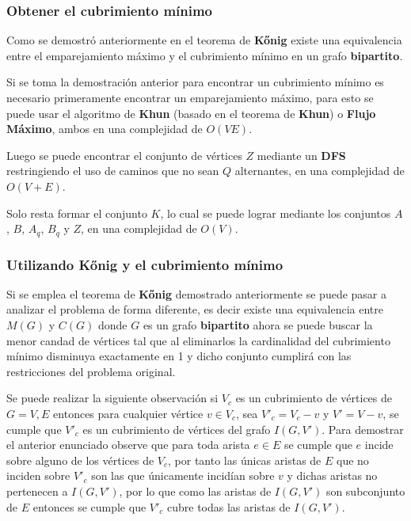 \documentclass{article}
\begin{document}
\subsubsection{Obtener el cubrimiento mínimo}

Como se demostró anteriormente en el teorema de \textbf{Kőnig} existe una equivalencia entre el emparejamiento máximo y
el cubrimiento mínimo en un grafo \textbf{bipartito}.

Si se toma la demostración anterior para encontrar un cubrimiento mínimo es necesario primeramente encontrar un emparejamiento
máximo, para esto se puede usar el algoritmo de \textbf{Khun} (basado en el teorema de \textbf{Khun})
o \textbf{Flujo Máximo}, ambos en una complejidad de $O(VE)$.

Luego se puede encontrar el conjunto de vértices $Z$ mediante un \textbf{DFS} restringiendo el uso de caminos que no sean
$Q$ alternantes, en una complejidad de $O(V+E)$.

Solo resta formar el conjunto $K$, lo cual se puede lograr mediante los conjuntos $A$, $B$, $A_q$, $B_q$ y $Z$, en una complejidad
de $O(V)$.

\subsubsection{Utilizando \textbf{Kőnig} y el cubrimiento mínimo}

Si se emplea el teorema de \textbf{Kőnig} demostrado anteriormente se puede pasar a analizar el problema de forma diferente,
es decir existe una equivalencia entre $M(G)$ y $C(G)$ donde $G$ es un grafo \textbf{bipartito} ahora se puede buscar
la menor candad de vértices tal que al eliminarlos la cardinalidad del cubrimiento mínimo disminuya exactamente en 1 y dicho conjunto cumplirá
con las restricciones del problema original.

Se puede realizar la siguiente observación si $V_c$ es un cubrimiento de vértices de $G = V, E$ entonces para cualquier vértice $v \in V_c$, sea $V'_c=V_c - v$
y $V'= V-v$, se cumple que $V'_c$ es un cubrimiento de vértices del grafo $I(G,V')$. Para demostrar el anterior enunciado observe que para toda arista $e\in E$
se cumple que $e$ incide sobre alguno de los vértices de $V_c$, por tanto las únicas aristas de
$E$ que no inciden sobre $V'_c$ son las que únicamente incidían sobre $v$ y dichas aristas no pertenecen a $I(G,V')$,
por lo que como las aristas de $I(G,V')$ son subconjunto de $E$ entonces se cumple que $V'_c$ cubre todas las aristas
de $I(G,V')$.
\end{document}
